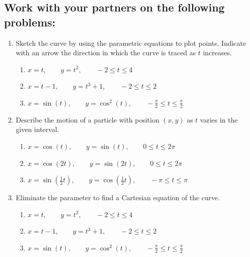 \subsection*{Work with your partners on the following problems:}
\begin{enumerate}[{Problem} 1:]


\item Sketch the curve by using the parametric equations to plot points. Indicate with an arrow the direction in which the curve is traced as \(t\) increases.
\begin{enumerate}
\item \(x = t, \qquad y = t^2, \qquad -2\leq t \leq 4\)
\item \(x = t-1, \qquad y =t^3+1, \qquad -2\leq t \leq 2\)
\item \(x = \sin(t), \qquad y = \cos^2(t), \qquad -\frac{\pi}{2} \leq t \leq\frac{\pi}{2}\)
\end{enumerate}
\vfill

\item Describe the motion of a particle with position \((x,y)\) as \(t\) varies in the given interval.
\begin{enumerate}
\item \(x = \cos(t), \qquad y = \sin(t), \qquad 0\leq t \leq 2\pi\)
\item \(x = \cos(2t), \qquad y = \sin(2t), \qquad 0\leq t \leq 2\pi\)
\item \(x = \sin \left(\tfrac{1}{2}t\right), \qquad y = \cos \left(\tfrac{1}{2}t\right), \qquad -\pi\leq t \leq \pi\)
\end{enumerate}

\vfill

\item Eliminate the parameter to find a Cartesian equation of the curve.
\begin{enumerate}
\item \(x = t, \qquad y = t^2, \qquad -2\leq t \leq 4\)
\item \(x = t-1, \qquad y =t^3+1, \qquad -2\leq t \leq 2\)
\item \(x = \sin(t), \qquad y = \cos^2(t), \qquad -\frac{\pi}{2} \leq t \leq \frac{\pi}{2}\)
\end{enumerate}
\vfill



\end{enumerate}



